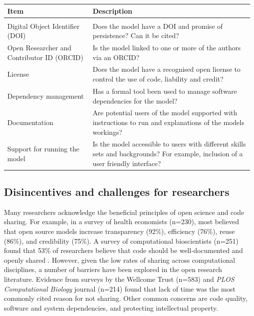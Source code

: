 \documentclass[]{interact}
\theoremstyle{plain}%
\theoremstyle{definition}
\theoremstyle{remark}
\begin{document}
\begin{table}[htp!]
{\begin{tabular}{lp{7.5cm}} \toprule
\textbf{Item}                      & \textbf{Description}                                                                                                  \\ \hline \\
Digital Object Identifier  (DOI)        & 
Does the model have a DOI and promise of persistence? Can it be cited?

                                              \\
Open Researcher and Contributor ID (ORCID) & Is the model linked to one or more of the authors via an ORCID?  

\\
License                            & Does the model have a recognised open license to control the use of code, liability and credit?   

\\
Dependency management              & Has a formal tool been used to manage software dependencies for the model?  

\\
Documentation                      & Are potential users of the model supported with instructions to run and explanations of the models workings?      

\\
Support for running the model      & Is the model accessible to users with different skills sets and backgrounds? For example, inclusion of a user friendly interface?

                                            \bottomrule
\end{tabular}}
\label{tab:bpa}
\end{table}





\subsection{Disincentives and challenges for researchers}



Many researchers acknowledge the beneficial principles of open science and code sharing. For example, in a survey of health economists \citep{POUWELS2022473}(n=230), most believed that open source models increase transparency (92\%), efficiency (76\%), reuse (86\%), and credibility (75\%). A survey of computational bioscientists (n=251) found that 53\% of researchers believe that code should be well-documented and openly shared \citep{samota2021knowledge}.  However, given the low rates of sharing across computational disciplines, a number of barriers have been explored in the open research literature. Evidence from surveys by the Wellcome Trust (n=583) \citep{rrepo24866} and \textit{PLOS Computational Biology} journal   \citep{hrynaszkiewicz2021survey} (n=214) found that lack of time was the most commonly cited reason for not sharing. Other common concerns are code quality, software and system dependencies, and protecting intellectual property. 
\end{document}
